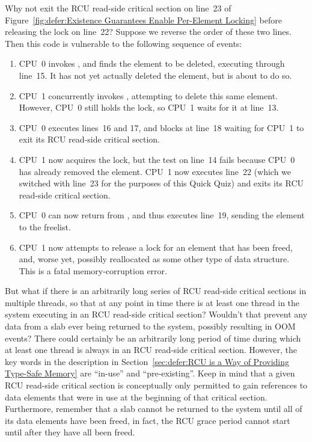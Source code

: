\begin{enumerate}
\QuickQ{}
	Why not exit the RCU read-side critical section on
	line~23 of
	Figure~\ref{fig:defer:Existence Guarantees Enable Per-Element Locking}
	before releasing the lock on line~22?
\QuickA{}
	Suppose we reverse the order of these two lines.
	Then this code is vulnerable to the following sequence of
	events:
	\begin{enumerate}
	\item	CPU~0 invokes , and finds the element
		to be deleted, executing through line~15.
		It has not yet actually deleted the element, but
		is about to do so.
	\item	CPU~1 concurrently invokes , attempting
		to delete this same element.
		However, CPU~0 still holds the lock, so CPU~1 waits
		for it at line~13.
	\item	CPU~0 executes lines~16 and 17, and blocks at
		line~18 waiting for CPU~1 to exit its RCU read-side
		critical section.
	\item	CPU~1 now acquires the lock, but the test on line~14
		fails because CPU~0 has already removed the element.
		CPU~1 now executes line~22 (which we switched with line~23
		for the purposes of this Quick Quiz)
		and exits its RCU read-side critical section.
	\item	CPU~0 can now return from ,
		and thus executes line~19, sending the element to
		the freelist.
	\item	CPU~1 now attempts to release a lock for an element
		that has been freed, and, worse yet, possibly
		reallocated as some other type of data structure.
		This is a fatal memory-corruption error.
	\end{enumerate}

\QuickQ{}
	But what if there is an arbitrarily long series of RCU
	read-side critical sections in multiple threads, so that at
	any point in time there is at least one thread in the system
	executing in an RCU read-side critical section?
	Wouldn't that prevent any data from a 
	slab ever being returned to the system, possibly resulting
	in OOM events?
\QuickA{}
	There could certainly be an arbitrarily long period of time
	during which at least one thread is always in an RCU read-side
	critical section.
	However, the key words in the description in
	Section~\ref{sec:defer:RCU is a Way of Providing Type-Safe Memory}
	are ``in-use'' and ``pre-existing''.
	Keep in mind that a given RCU read-side critical section is
	conceptually only permitted to gain references to data elements
	that were in use at the beginning of that critical section.
	Furthermore, remember that a slab cannot be returned to the
	system until all of its data elements have been freed, in fact,
	the RCU grace period cannot start until after they have all been
	freed.


\end{enumerate}
